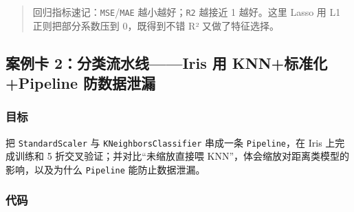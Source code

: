 \begin{Shaded}
\begin{Highlighting}[]
\end{Highlighting}
\end{Shaded}

\begin{quote}
回归指标速记：\texttt{MSE}/\texttt{MAE} 越小越好；\texttt{R2} 越接近 1
越好。这里 Lasso 用 L1 正则把部分系数压到 0，既得到不错 R²
又做了特征选择。
\end{quote}

\subsection{案例卡 2：分类流水线------Iris 用 KNN+标准化+Pipeline
防数据泄漏}\label{ux6848ux4f8bux5361-2ux5206ux7c7bux6d41ux6c34ux7ebfiris-ux7528-knnux6807ux51c6ux5316pipeline-ux9632ux6570ux636eux6cc4ux6f0f}

\subsubsection{目标}\label{ux76eeux6807-31}

把 \texttt{StandardScaler} 与 \texttt{KNeighborsClassifier} 串成一条
\texttt{Pipeline}，在 Iris 上完成训练和 5
折交叉验证；并对比``未缩放直接喂
KNN''，体会缩放对距离类模型的影响，以及为什么 \texttt{Pipeline}
能防止数据泄漏。

\subsubsection{代码}\label{ux4ee3ux7801-32}

